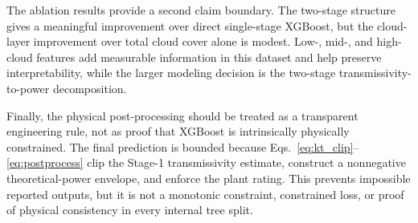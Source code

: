 The ablation results provide a second claim boundary. The two-stage structure gives a meaningful improvement over direct single-stage XGBoost, but the cloud-layer improvement over total cloud cover alone is modest. Low-, mid-, and high-cloud features add measurable information in this dataset and help preserve interpretability, while the larger modeling decision is the two-stage transmissivity-to-power decomposition.

Finally, the physical post-processing should be treated as a transparent engineering rule, not as proof that XGBoost is intrinsically physically constrained. The final prediction is bounded because Eqs.~\eqref{eq:kt_clip}--\eqref{eq:postprocess} clip the Stage-1 transmissivity estimate, construct a nonnegative theoretical-power envelope, and enforce the plant rating. This prevents impossible reported outputs, but it is not a monotonic constraint, constrained loss, or proof of physical consistency in every internal tree split.


